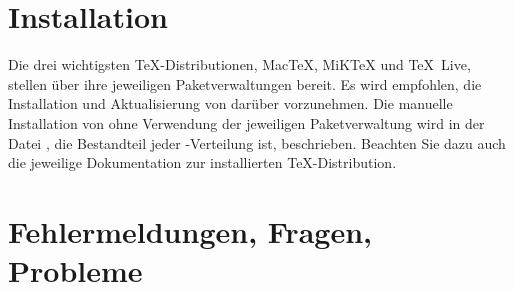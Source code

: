 \section{Installation}

Die drei wichtigsten \TeX-Distributionen, Mac\TeX, MiK\TeX{} und \TeX~Live,
stellen \KOMAScript{} über ihre jeweiligen Paketverwaltungen bereit. Es wird
empfohlen, die Installation und Aktualisierung von \KOMAScript{} darüber
vorzunehmen. Die manuelle Installation von {\KOMAScript} ohne Verwendung der
jeweiligen Paketverwaltung wird in der Datei , die
Bestandteil jeder \KOMAScript-Verteilung ist, beschrieben.  Beachten Sie dazu
auch die jeweilige Dokumentation zur installierten \TeX-Distribution.

\section{Fehlermeldungen, Fragen, Probleme}

